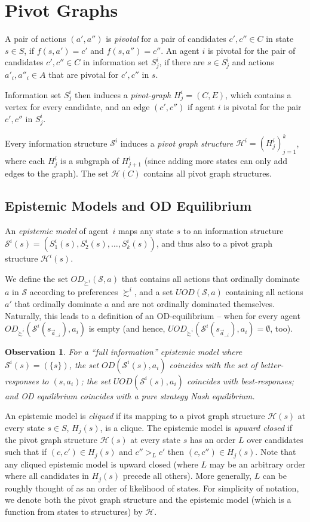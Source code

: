 \documentclass[letterpaper]{article} %
\def\calS{\mathcal{S}}
\def\calH{\mathcal{H}}
\newtheorem{observation}[theorem]{Observation}
\begin{document}
\section{Pivot Graphs}
A pair of actions $(a',a'')$ is \emph{pivotal} for a pair of candidates $c',c''\in C$ in state $s\in S$, if $f(s,a')=c'$ and $f(s,a'')=c''$. 
An agent $i$ is pivotal for the pair of candidates $c',c''\in C$ in information set $S^i_j$, if there are $s\in S^i_j$ and actions $a'_i,a''_i\in A$ that are pivotal for $c',c''$ in $s$. 

Information set $S^{i}_j$ then induces a \emph{pivot-graph} $H^i_j=(C,E)$, which contains a vertex for every candidate, and an edge $(c',c'')$ if agent $i$ is pivotal for the pair $c',c''$ in $S^i_j$. 

Every information structure $\mathcal{S}^i$ induces a \emph{pivot graph structure} $\mathcal{H}^i=(H^i_{j})_{j=1}^k$, where each $H^i_j$ is a subgraph of $H^i_{j+1}$ (since adding more states can only add edges to the graph). The set $\mathscr{H}(C)$ contains all pivot graph structures. 

\subsection{Epistemic Models and OD Equilibrium}
 An \emph{epistemic model} of agent~$i$ maps any state $s$ to an information structure $\calS^i(s)=(S^i_1(s),S^i_2(s),\ldots,S^i_k(s))$, and thus also to a pivot graph structure $\calH^i(s)$. 
 
 We define the set $OD_{\succsim^i}(\calS,a)$ that contains all actions that ordinally dominate $a$ in $\calS$ according to preferences $\succsim^i$, and a set $UOD(\calS,a)$ containing all actions $a'$ that ordinally dominate $a$ and are not ordinally dominated themselves. Naturally, this leads to a definition of an OD-equilibrium -- when for every agent $OD_{\succsim^i}(\calS^i(s_{\vec a_{-i}}),a_i)$ is empty (and hence, $UOD_{\succsim^i}(\calS^i(s_{\vec a_{-i}}),a_i)=\emptyset$, too).

\begin{observation}
For a ``full information'' epistemic model where $\calS^i(s)=\left(\{s\}\right)$, the set $OD(\calS^i(s),a_i)$ coincides with the set of better-responses to $(s,a_i)$; the set $UOD(\calS^i(s),a_i)$ coincides with best-responses; and OD equilibrium coincides with a pure strategy Nash equilibrium.
\end{observation}

An epistemic model is \emph{cliqued} if its mapping to a pivot graph structure $\calH(s)$ at every state $s\in S$, $H_j(s)$, is a clique. The epistemic model is \emph{upward closed} if the pivot graph structure $\calH(s)$ at every state $s$ has an order $L$ over candidates such that if $(c,c')\in H_j(s)$ and $c''>_L c'$ then $(c,c'')\in H_j(s)$. Note that any cliqued epistemic model is upward closed (where $L$ may be an arbitrary order where all candidates in $H_j(s)$ precede all others).	More generally, $L$ can be roughly thought of as an order of likelihood of states. For simplicity of notation, we denote both the pivot graph structure and the epistemic model (which is a function from states to structures) by $\calH$.
\end{document}
